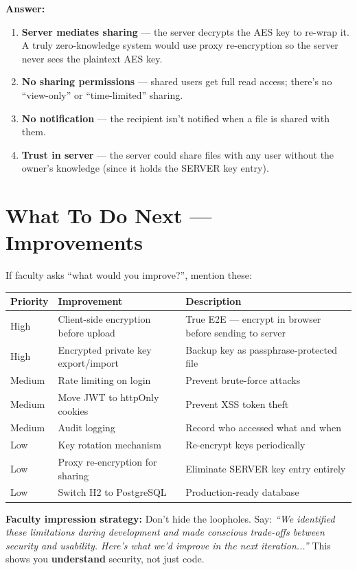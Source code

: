 \documentclass[11pt,a4paper]{article}
\begin{document}
\textbf{Answer:}
\begin{enumerate}
  \item \textbf{Server mediates sharing} --- the server decrypts the AES key to re-wrap it. A truly zero-knowledge system would use proxy re-encryption so the server never sees the plaintext AES key.
  \item \textbf{No sharing permissions} --- shared users get full read access; there's no ``view-only'' or ``time-limited'' sharing.
  \item \textbf{No notification} --- the recipient isn't notified when a file is shared with them.
  \item \textbf{Trust in server} --- the server could share files with any user without the owner's knowledge (since it holds the SERVER key entry).
\end{enumerate}

\vspace{0.5cm}

\section{What To Do Next --- Improvements}

If faculty asks ``what would you improve?'', mention these:

\begin{center}
\begin{tabular}{@{}llp{8cm}@{}}
\toprule
\textbf{Priority} & \textbf{Improvement} & \textbf{Description} \\
\midrule
High & Client-side encryption before upload & True E2E --- encrypt in browser before sending to server \\[0.3em]
High & Encrypted private key export/import & Backup key as passphrase-protected file \\[0.3em]
Medium & Rate limiting on login & Prevent brute-force attacks \\[0.3em]
Medium & Move JWT to httpOnly cookies & Prevent XSS token theft \\[0.3em]
Medium & Audit logging & Record who accessed what and when \\[0.3em]
Low & Key rotation mechanism & Re-encrypt keys periodically \\[0.3em]
Low & Proxy re-encryption for sharing & Eliminate SERVER key entry entirely \\[0.3em]
Low & Switch H2 to PostgreSQL & Production-ready database \\
\bottomrule
\end{tabular}
\end{center}

\vspace{0.5cm}

\begin{tipbox}
\textbf{Faculty impression strategy:} Don't hide the loopholes. Say: \textit{``We identified these limitations during development and made conscious trade-offs between security and usability. Here's what we'd improve in the next iteration...''} This shows you \textbf{understand} security, not just code.
\end{tipbox}
\end{document}
